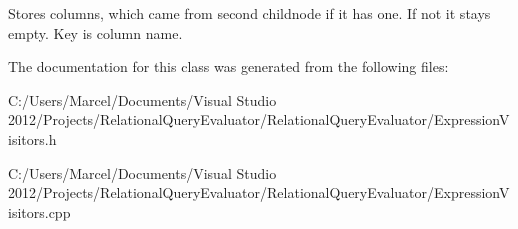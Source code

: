 Stores columns, which came from second childnode if it has one. If not it stays empty. Key is column name. 

The documentation for this class was generated from the following files\+:\begin{DoxyCompactItemize}
\item 
C\+:/\+Users/\+Marcel/\+Documents/\+Visual Studio 2012/\+Projects/\+Relational\+Query\+Evaluator/\+Relational\+Query\+Evaluator/Expression\+Visitors.\+h\item 
C\+:/\+Users/\+Marcel/\+Documents/\+Visual Studio 2012/\+Projects/\+Relational\+Query\+Evaluator/\+Relational\+Query\+Evaluator/Expression\+Visitors.\+cpp\end{DoxyCompactItemize}
